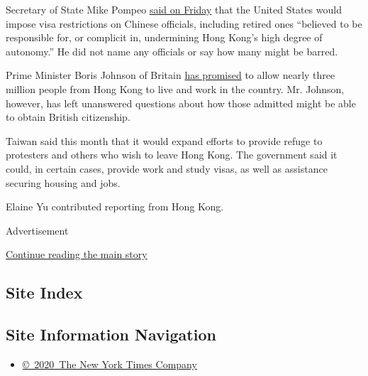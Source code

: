 Secretary of State Mike Pompeo
\href{https://www.state.gov/u-s-department-of-state-imposes-visa-restrictions-on-chinese-communist-party-officials-for-undermining-hong-kongs-high-degree-of-autonomy-and-restricting-human-rights/}{said
on Friday} that the United States would impose visa restrictions on
Chinese officials, including retired ones ``believed to be responsible
for, or complicit in, undermining Hong Kong's high degree of autonomy.''
He did not name any officials or say how many might be barred.

Prime Minister Boris Johnson of Britain
\href{https://www.nytimes3xbfgragh.onion/2020/06/03/world/europe/boris-johnson-uk-hong-kong-china.html}{has
promised} to allow nearly three million people from Hong Kong to live
and work in the country. Mr. Johnson, however, has left unanswered
questions about how those admitted might be able to obtain British
citizenship.

Taiwan said this month that it would expand efforts to provide refuge to
protesters and others who wish to leave Hong Kong. The government said
it could, in certain cases, provide work and study visas, as well as
assistance securing housing and jobs.

Elaine Yu contributed reporting from Hong Kong.

Advertisement

\protect\hyperlink{after-bottom}{Continue reading the main story}

\hypertarget{site-index}{%
\subsection{Site Index}\label{site-index}}

\hypertarget{site-information-navigation}{%
\subsection{Site Information
Navigation}\label{site-information-navigation}}

\begin{itemize}
\tightlist
\item
  \href{https://help.nytimes3xbfgragh.onion/hc/en-us/articles/115014792127-Copyright-notice}{©~2020~The
  New York Times Company}
\end{itemize}


